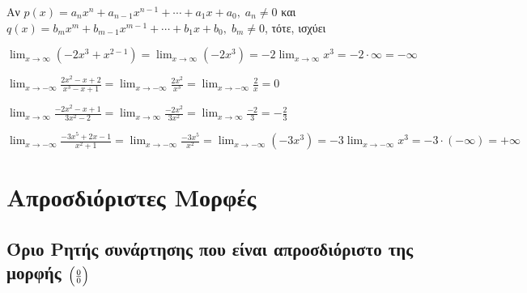 \begin{prop}
  Αν $ p(x) = a_{n} x^{n} + a_{n-1}x^{n-1}+\cdots + a_{1}x + a_{0}, \; a_{n} \neq 0  $ 
  και $ q(x) = b_{m} x^{m} + b_{m-1}x^{m-1}+\cdots + b_{1}x + b_{0}, \; b_{m} \neq 0 $, 
  τότε, ισχύει 
  \begin{center}
  \end{center}
\end{prop}

\begin{example}
  $ \lim_{x \to \infty} (-2x^{3}+x^{2-1}) = \lim_{x \to \infty} (-2x^{3}) = -2
  \lim_{x \to \infty} x^{3} = -2 \cdot \infty = - \infty $
\end{example}
\begin{example}
  $ \lim_{x \to - \infty} \frac{2x^{2}-x+2}{x^{3}-x+1} = \lim_{x \to - \infty}
  \frac{2 x^{2}}{x^{3}} = \lim_{x \to - \infty} \frac{2}{x} = 0 $
\end{example}
\begin{example}
  $ \lim_{x \to \infty} \frac{-2x^{2}-x+1}{3x^{2}-2} = \lim_{x \to \infty}
  \frac{-2 x^{2}}{3 x^{2}} = \lim_{x \to \infty} \frac{-2}{3} = - 
  \frac{2}{3} $ 
\end{example}
\begin{example}
  $ \lim_{x \to - \infty} \frac{-3x^{5}+2x-1}{x^{2}+1} = \lim_{x \to - \infty}
  \frac{-3x^{5}}{x^{2}} = \lim_{x \to - \infty} (-3x^{3}) = -3 \lim_{x \to - \infty}
  x^{3} = -3 \cdot (- \infty) = + \infty $
\end{example}


\newpage


\section*{Απροσδιόριστες Μορφές}

\subsection*{Όριο Ρητής συνάρτησης που είναι απροσδιόριστο της μορφής $\Bigl(\frac{0}{0}\Bigr) $}

